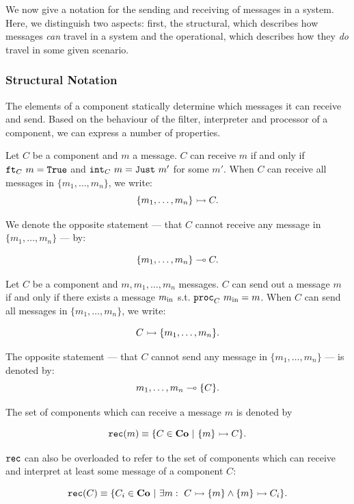 We now give a notation for the sending and receiving of messages in a system. Here, we distinguish two aspects: first, the structural, which describes how messages {\em can} travel in a system and the operational, which describes how they {\em do} travel in some given scenario.

\subsubsection{Structural Notation}

The elements of a component statically determine which messages it can receive and send. Based on the behaviour of the filter, interpreter and processor of a component, we can express a number of properties.

\begin{definition}
	Let $C$ be a component and $m$ a message. $C$ can receive $m$ if and only if $\texttt{ft}_{C}\ m = \mathtt{True}$ and $\texttt{int}_{C}\ m = \mathtt{Just}\ m'$ for some $m'$.
	When $C$ can receive all messages in $\{m_1,\dots,m_n\}$, we write:
	$$
	\{m_1,\dots,m_n\} \rightarrowtail C.
	$$
	
	We denote the opposite statement --- that $C$ cannot receive any message in $\{m_1,\dots,m_n\}$ --- by:
	
	$$
	\{m_1,\dots,m_n\} \multimap C.
	$$
\end{definition}

\begin{definition}
	Let $C$ be a component and $m, m_1,\dots,m_n$ messages. $C$ can send out a message $m$ if and only if there exists a message $m_{\textnormal{in}}$ s.t. $\texttt{proc}_{C}\ m_{\textnormal{in}} = m$.
	When $C$ can send all messages in $\{m_1,\dots,m_n\}$, we write:
	
	$$
	C \rightarrowtail \{m_1,\dots,m_n\}.
	$$
	
	The opposite statement --- that $C$ cannot send any message in $\{m_1,\dots,m_n\}$ --- is denoted by:
	$$
	m_1,\dots,m_n \multimap \{C\}.
	$$
\end{definition}

\begin{definition}
	The set of components which can receive a message $m$ is denoted by
	
	$$
	\rec{m} \equiv \{C \in \co\ |\ \canrec{m}{C} \}.
	$$
	
	$\mathtt{rec}$ can also be overloaded to refer to the set of components which can receive and interpret at least some message of a component $C$:
	
	$$
	\mathtt{rec}(C) \equiv \{C_i \in \mathbf{Co}\ |\ \exists m:\ C \rightarrowtail \{m\} \wedge \{m\} \rightarrowtail C_i \}.
	$$
\end{definition}


